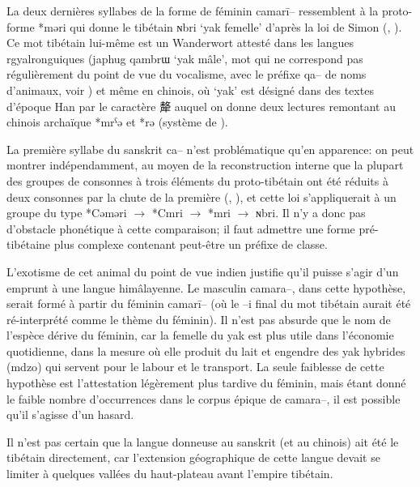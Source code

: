 \documentclass[oldfontcommands,oneside,a4paper,11pt]{article}
\newcommand{\ipa}[1]{{\phon #1}} %
\newcommand{\zh}[1]{{\cn #1}}
\begin{document}
La deux dernières syllabes de la forme de féminin \ipa{camarī--} ressemblent à la proto-forme *\ipa{məri} qui donne le tibétain  \ipa{ɴbri} `yak femelle' d'après la loi de Simon (\citealt[187]{simon29}, \citealt{hill11laws}). Ce mot tibétain lui-même est un Wanderwort attesté dans les langues rgyalronguiques (japhug \ipa{qambrɯ} `yak mâle', mot qui ne correspond pas régulièrement du point de vue du vocalisme, avec le préfixe \ipa{qa--} de noms d'animaux, voir   \citealt[158-9]{jacques14snom}) et même en chinois, où  `yak' est désigné dans des textes d'époque Han par le caractère \zh{犛} auquel on donne deux lectures remontant au chinois archaïque *\ipa{mrˁə} et *\ipa{rə} (système de \citealt{bs14oc}).

La première syllabe du sanskrit \ipa{ca--} n'est problématique qu'en apparence: on peut montrer indépendamment, au moyen de la reconstruction interne que la plupart des groupes de consonnes à trois éléments du proto-tibétain ont été réduits à deux consonnes par la chute de la première (\citealt{coblin76}, \citealt{hill11laws}), et cette loi s'appliquerait à un groupe du type *\ipa{Cəməri} $\rightarrow$ *\ipa{Cmri} $\rightarrow$ *\ipa{mri} $\rightarrow$ \ipa{ɴbri}. Il n'y a donc pas d'obstacle phonétique à cette comparaison; il faut admettre une forme pré-tibétaine plus complexe contenant peut-être un préfixe de classe. 
  
L'exotisme de cet animal du point de vue indien justifie qu'il puisse s'agir d'un emprunt à une langue himâlayenne. Le masculin \ipa{camara--}, dans cette hypothèse, serait formé à partir du féminin \ipa{camarī--} (où le \ipa{--i} final du mot tibétain aurait été ré-interprété comme le thème du féminin). Il n'est pas absurde que le nom de l'espèce dérive du féminin, car la femelle du yak est plus utile dans l'économie quotidienne, dans la mesure où elle produit du lait et engendre des yak hybrides (\ipa{mdzo}) qui servent pour le labour et le transport. La seule faiblesse de cette hypothèse est l'attestation légèrement plus tardive du féminin, mais étant donné le faible nombre d'occurrences dans le corpus épique de \ipa{camara--}, il est possible qu'il s'agisse d'un hasard.

Il n'est pas certain que la langue donneuse au sanskrit (et au chinois) ait été le tibétain directement, car l'extension géographique de cette langue devait se limiter à quelques vallées du haut-plateau avant l'empire tibétain. 
  


\end{document}
